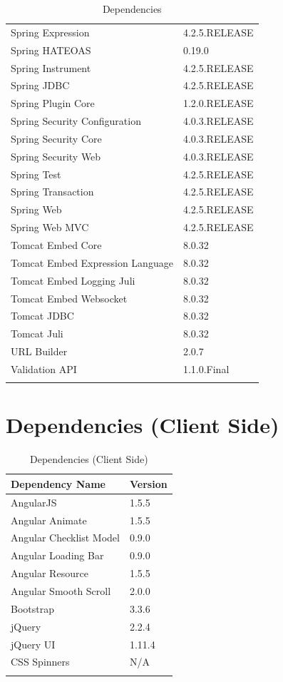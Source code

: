 \documentclass[12pt]{scrreprt}
\begin{document}
\begin{longtable}{ l | l }
				Spring Expression					& 4.2.5.RELEASE		\\
				Spring HATEOAS						& 0.19.0			\\
				Spring Instrument					& 4.2.5.RELEASE		\\
				Spring JDBC							& 4.2.5.RELEASE		\\
				Spring Plugin Core					& 1.2.0.RELEASE		\\
				Spring Security Configuration		& 4.0.3.RELEASE		\\
				Spring Security Core				& 4.0.3.RELEASE		\\
				Spring Security Web					& 4.0.3.RELEASE		\\
				Spring Test							& 4.2.5.RELEASE		\\
				Spring Transaction					& 4.2.5.RELEASE		\\
				Spring Web							& 4.2.5.RELEASE		\\
				Spring Web MVC						& 4.2.5.RELEASE		\\
				Tomcat Embed Core					& 8.0.32			\\
				Tomcat Embed Expression Language	& 8.0.32			\\
				Tomcat Embed Logging Juli			& 8.0.32			\\
				Tomcat Embed Websocket				& 8.0.32			\\
				Tomcat JDBC							& 8.0.32			\\
				Tomcat Juli							& 8.0.32			\\
				URL Builder							& 2.0.7				\\
				Validation API						& 1.1.0.Final		\\

				\caption{Dependencies}
			\end{longtable}


		\section{Dependencies (Client Side)}
			\label{sec:appendix_dependencies-client}

			\begin{longtable}{ l | l }
				\label{tab:appendix_dependencies-client}

				\textbf{Dependency Name} & \textbf{Version} \\
				\hline
				AngularJS				& 1.5.5		\\
				Angular Animate			& 1.5.5		\\
				Angular Checklist Model	& 0.9.0		\\
				Angular Loading Bar		& 0.9.0		\\
				Angular Resource		& 1.5.5		\\
				Angular Smooth Scroll	& 2.0.0		\\
				Bootstrap				& 3.3.6		\\
				jQuery					& 2.2.4		\\
				jQuery UI				& 1.11.4	\\
				CSS Spinners			& N/A		\\

				\caption{Dependencies (Client Side)}
			\end{longtable}



	\listoffigures
	\listoftables
\end{document}
